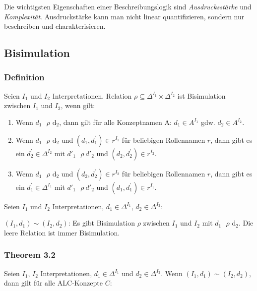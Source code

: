Die wichtigsten Eigenschaften einer Beschreibungslogik sind
\emph{Ausdrucksstärke} und \emph{Komplexität}. Ausdruckstärke kann man
nicht linear quantifizieren, sondern nur beschreiben und
charakterisieren.

\subsection{Bisimulation}\label{bisimulation}

\subsubsection{Definition}\label{definition-2}

Seien $I_{1}$ und $I_{2}$ Interpretationen. Relation
$\rho \subseteq \Delta^{I_{1}} \times \Delta^{I_{2}}$ ist Bisimulation
zwischen $I_{1}$ und $I_{2}$, wenn gilt:

\begin{enumerate}
\def\labelenumi{\arabic{enumi}.}
\item
  Wenn $d_{1}\text{\ $\rho$}\text{\ d}_{2}$, dann gilt für alle
  Konzeptnamen A: $d_{1} \in A^{I_{1}}$ gdw. $d_{2} \in A^{I_{2}}$.
\item
  Wenn $d_{1}\text{\ $\rho$}\text{\ d}_{2}$ und
  $\left( d_{1},d_{1}^{'} \right) \in r^{I_{1}}$ für beliebigen
  Rollennamen $r$, dann gibt es ein $d_{2}^{'} \in \Delta^{I_{2}}$
  mit ${d'}_{1}\text{\ $\rho$}{\ d'}_{2}$ und
  $\left( d_{2},d_{2}^{'} \right) \in r^{I_{2}}$.
\item
  Wenn $d_{1}\text{\ $\rho$}\text{\ d}_{2}$ und
  $\left( d_{2},d_{2}^{'} \right) \in r^{I_{2}}$ für beliebigen
  Rollennamen $r$, dann gibt es ein $d_{1}^{'} \in \Delta^{I_{1}}$
  mit ${d'}_{1}\text{\ $\rho$}{\ d'}_{2}$ und
  $\left( d_{1},d_{1}^{'} \right) \in r^{I_{1}}$.
\end{enumerate}

Seien $I_{1}$ und $I_{2}$ Interpretationen,
$d_{1} \in \Delta^{I_{1}}$, $d_{2} \in \Delta^{I_{2}}$:

$(I_{1},d_{1}) \sim (I_{2},d_{2})$: Es gibt Bisimulation $\rho$
zwischen $I_{1}$ und $I_{2}$ mit $d_{1}\text{\ $\rho$}\text{\ d}_{2}$.
Die leere Relation ist immer Bisimulation.

\subsubsection{Theorem 3.2}\label{theorem-3.2}

Seien $I_{1}$, $I_{2}$ Interpretationen,
$d_{1} \in \Delta^{I_{1}}$ und $d_{2} \in \Delta^{I_{2}}$. Wenn
$(I_{1},d_{1}) \sim (I_{2},d_{2})$, dann gilt für alle ALC-Konzepte
$C$:

